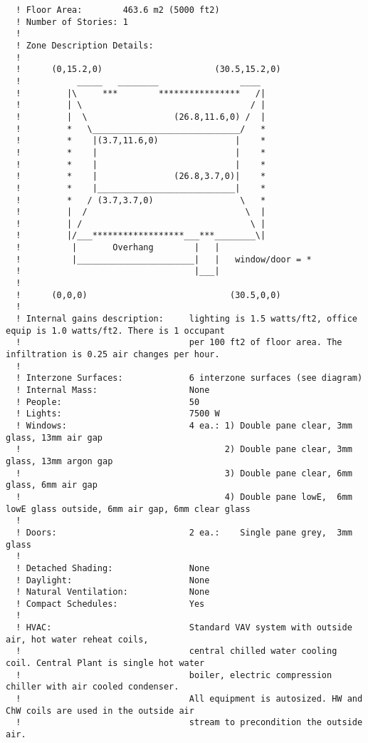 \begin{lstlisting}
  ! Floor Area:        463.6 m2 (5000 ft2)
  ! Number of Stories: 1
  !
  ! Zone Description Details:
  !
  !      (0,15.2,0)                      (30.5,15.2,0)
  !           _____   ________                ____
  !         |\     ***        ****************   /|
  !         | \                                 / |
  !         |  \                 (26.8,11.6,0) /  |
  !         *   \_____________________________/   *
  !         *    |(3.7,11.6,0)               |    *
  !         *    |                           |    *
  !         *    |                           |    *
  !         *    |               (26.8,3.7,0)|    *
  !         *    |___________________________|    *
  !         *   / (3.7,3.7,0)                 \   *
  !         |  /                               \  |
  !         | /                                 \ |
  !         |/___******************___***________\|
  !          |       Overhang        |   |
  !          |_______________________|   |   window/door = *
  !                                  |___|
  !
  !      (0,0,0)                            (30.5,0,0)
  !
  ! Internal gains description:     lighting is 1.5 watts/ft2, office equip is 1.0 watts/ft2. There is 1 occupant
  !                                 per 100 ft2 of floor area. The infiltration is 0.25 air changes per hour.
  !
  ! Interzone Surfaces:             6 interzone surfaces (see diagram)
  ! Internal Mass:                  None
  ! People:                         50
  ! Lights:                         7500 W
  ! Windows:                        4 ea.: 1) Double pane clear, 3mm glass, 13mm air gap
  !                                        2) Double pane clear, 3mm glass, 13mm argon gap
  !                                        3) Double pane clear, 6mm glass, 6mm air gap
  !                                        4) Double pane lowE,  6mm lowE glass outside, 6mm air gap, 6mm clear glass
  !
  ! Doors:                          2 ea.:    Single pane grey,  3mm glass
  !
  ! Detached Shading:               None
  ! Daylight:                       None
  ! Natural Ventilation:            None
  ! Compact Schedules:              Yes
  !
  ! HVAC:                           Standard VAV system with outside air, hot water reheat coils,
  !                                 central chilled water cooling coil. Central Plant is single hot water
  !                                 boiler, electric compression chiller with air cooled condenser.
  !                                 All equipment is autosized. HW and ChW coils are used in the outside air
  !                                 stream to precondition the outside air.

\end{lstlisting}
